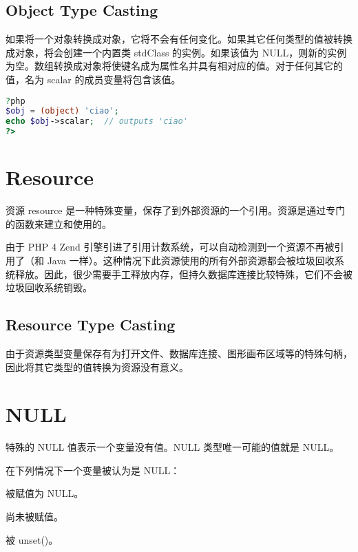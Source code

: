 \subsection{Object Type Casting}

如果将一个对象转换成对象，它将不会有任何变化。如果其它任何类型的值被转换成对象，将会创建一个内置类 stdClass 的实例。如果该值为 NULL，则新的实例为空。数组转换成对象将使键名成为属性名并具有相对应的值。对于任何其它的值，名为 scalar 的成员变量将包含该值。


\begin{lstlisting}[language=PHP]
?php
$obj = (object) 'ciao';
echo $obj->scalar;  // outputs 'ciao'
?>
\end{lstlisting}



\section{Resource}

资源 resource 是一种特殊变量，保存了到外部资源的一个引用。资源是通过专门的函数来建立和使用的。

由于 PHP 4 Zend 引擎引进了引用计数系统，可以自动检测到一个资源不再被引用了（和 Java 一样）。这种情况下此资源使用的所有外部资源都会被垃圾回收系统释放。因此，很少需要手工释放内存，但持久数据库连接比较特殊，它们不会被垃圾回收系统销毁。


\subsection{Resource Type Casting}

由于资源类型变量保存有为打开文件、数据库连接、图形画布区域等的特殊句柄，因此将其它类型的值转换为资源没有意义。




\section{NULL}

特殊的 NULL 值表示一个变量没有值。NULL 类型唯一可能的值就是 NULL。

在下列情况下一个变量被认为是 NULL：

\begin{compactitem}
\item 被赋值为 NULL。
\item 尚未被赋值。
\item 被 unset()。
\end{compactitem}

